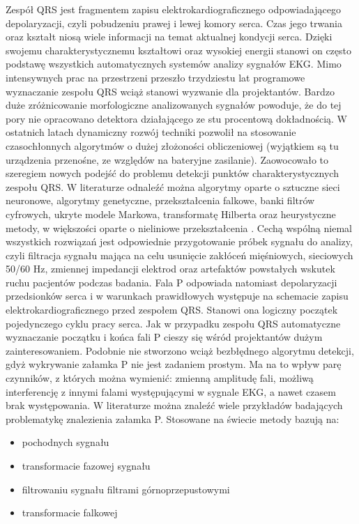 Zespół QRS jest fragmentem zapisu elektrokardiograficznego odpowiadającego depolaryzacji, czyli pobudzeniu prawej i lewej komory serca. Czas jego trwania oraz kształt niosą wiele informacji na temat aktualnej kondycji serca. Dzięki swojemu charakterystycznemu kształtowi oraz wysokiej energii stanowi on często podstawę wszystkich automatycznych systemów analizy sygnałów EKG. 
Mimo intensywnych prac na przestrzeni przeszło trzydziestu lat programowe wyznaczanie zespołu QRS wciąż stanowi wyzwanie dla projektantów. Bardzo duże zróżnicowanie morfologiczne analizowanych sygnałów powoduje, że do tej pory nie opracowano detektora działającego ze stu procentową dokładnością. W ostatnich latach dynamiczny rozwój techniki pozwolił na stosowanie czasochłonnych algorytmów o dużej złożoności obliczeniowej (wyjątkiem są tu urządzenia przenośne, ze względów na bateryjne zasilanie). Zaowocowało to szeregiem nowych podejść do problemu detekcji punktów charakterystycznych zespołu QRS. W literaturze odnaleźć można algorytmy oparte o sztuczne sieci neuronowe, algorytmy genetyczne, przekształcenia falkowe, banki filtrów cyfrowych, ukryte modele Markowa, transformatę Hilberta oraz heurystyczne metody, w większości oparte o nieliniowe przekształcenia \cite{Waves_TPoSQD} \cite{Waves_Pieciak}. Cechą wspólną niemal wszystkich rozwiązań jest odpowiednie przygotowanie próbek sygnału do analizy, czyli filtracja sygnału mająca na celu usunięcie zakłóceń mięśniowych, sieciowych 50/60 Hz, zmiennej impedancji elektrod oraz artefaktów powstałych wskutek ruchu pacjentów podczas badania.
Fala P odpowiada natomiast depolaryzacji przedsionków serca i w warunkach prawidłowych występuje na schemacie zapisu elektrokardiograficznego przed zespołem QRS. Stanowi ona logiczny początek pojedynczego cyklu pracy serca. Jak w przypadku zespołu QRS automatyczne wyznaczanie początku i końca fali P cieszy się wśród projektantów dużym zainteresowaniem. Podobnie nie stworzono wciąż bezbłędnego algorytmu detekcji, gdyż wykrywanie załamka P nie jest zadaniem prostym. Ma na to wpływ parę czynników, z których można wymienić: zmienną amplitudę fali, możliwą interferencję z innymi falami występującymi w sygnale EKG, a nawet czasem brak występowania. W literaturze można znaleźć wiele przykładów badających problematykę znalezienia załamka P. Stosowane na świecie metody bazują na:
\begin{itemize}
\item pochodnych sygnału \cite{Waves_ANAfPDitES}
\item transformacie fazowej sygnału \cite{Waves_aNMfADoEFPBotPT}    \cite{Waves_ProjZeszlyRok}
\item filtrowaniu sygnału filtrami górnoprzepustowymi \cite{Waves_ARPfPDaSiHR12E}
\item transformacie falkowej \cite{Waves_DoCPoEUQSWT}
\end{itemize}
